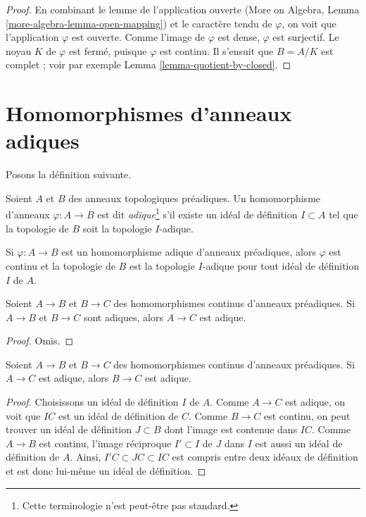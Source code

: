 \begin{proof}
En combinant le lemme de l'application ouverte (More on Algebra, Lemma
\ref{more-algebra-lemma-open-mapping})
et le caractère tendu de $\varphi$, 
on voit que l'application $\varphi$ est ouverte. Comme l'image de $\varphi$
est dense, $\varphi$ est surjectif. Le noyau $K$
de $\varphi$ est fermé, puisque $\varphi$ est continu.
Il s'ensuit que $B = A/K$ est complet ; voir par exemple
Lemma \ref{lemma-quotient-by-closed}.
\end{proof}







\section{Homomorphismes d'anneaux adiques}
\label{section-adic-ring-maps}

\noindent
Posons la définition suivante.

\begin{definition}
\label{definition-adic-homomorphism}
Soient $A$ et $B$ des anneaux topologiques préadiques. Un homomorphisme d'anneaux
$\varphi : A \to B$ est dit {\it adique}\footnote{Cette terminologie n'est peut-être pas standard.}
s'il existe un idéal de définition $I \subset A$ tel que
la topologie de $B$ soit la topologie $I$-adique.
\end{definition}

\noindent
Si $\varphi : A \to B$ est un homomorphisme adique d'anneaux préadiques, alors
$\varphi$ est continu et la topologie de $B$ est la topologie $I$-adique
pour tout idéal de définition $I$ de $A$.

\begin{lemma}
\label{lemma-composition-adic}
Soient $A \to B$ et $B \to C$ des homomorphismes continus d'anneaux
préadiques. Si $A \to B$ et $B \to C$ sont adiques, alors
$A \to C$ est adique.
\end{lemma}

\begin{proof}
Omis.
\end{proof}

\begin{lemma}
\label{lemma-permanence-adic}
Soient $A \to B$ et $B \to C$ des homomorphismes continus d'anneaux
préadiques. Si $A \to C$ est adique, alors
$B \to C$ est adique.
\end{lemma}

\begin{proof}
Choisissons un idéal de définition $I$ de $A$. Comme $A \to C$ est adique,
on voit que $IC$ est un idéal de définition de $C$.
Comme $B \to C$ est continu, on peut trouver un
idéal de définition $J \subset B$ dont l'image est contenue dans $IC$.
Comme $A \to B$ est continu, l'image réciproque $I' \subset I$
de $J$ dans $I$ est aussi un idéal de définition de $A$.
Ainsi, $I'C \subset JC \subset IC$ est compris entre
deux idéaux de définition et est donc lui-même un idéal de définition.
\end{proof}

